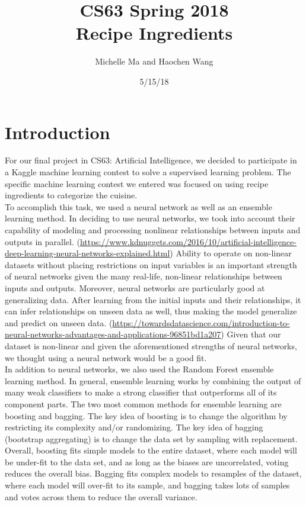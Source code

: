 \documentclass[11pt]{article}
\title{CS63 Spring 2018\\Recipe Ingredients}
\author{Michelle Ma and Haochen Wang}
\date{5/15/18}
\begin{document}
\maketitle

\section{Introduction}

For our final project in CS63: Artificial Intelligence, we decided to participate
in a Kaggle machine learning contest to solve a supervised learning problem. The
specific machine learning contest we entered was focused on using recipe ingredients
to categorize the cuisine. \\

To accomplish this task, we used a neural network as well as
an ensemble learning method. In deciding to use neural networks, we took into
account their capability of modeling and processing nonlinear relationships between
inputs and outputs in parallel.
(\url{https://www.kdnuggets.com/2016/10/artificial-intelligence-deep-learning-neural-networks-explained.html})
Ability to operate on non-linear datasets without placing restrictions on input variables
is an important strength of neural networks
given the many real-life, non-linear relationships between inputs and outputs. Moreover,
neural networks are particularly good at generalizing data. After learning from
the initial inputs and their relationships, it can infer relationships on
unseen data as well, thus making the model generalize and predict on unseen data.
(\url{https://towardsdatascience.com/introduction-to-neural-networks-advantages-and-applications-96851bd1a207})
Given that our dataset is non-linear and given the aforementioned strengths of
neural networks, we thought using a neural network would be a good fit.\\

In addition to neural networks, we also used the Random Forest ensemble
learning method. In general, ensemble learning works by combining the output
of many weak classifiers to make a strong classifier that outperforms all of
its component parts. The two most common methods for ensemble learning are
boosting and bagging. The key idea of boosting is to change the algorithm
by restricting its complexity and/or randomizing. The key idea of bagging (bootstrap
aggregating) is to change the data set by sampling with replacement. Overall,
boosting fits simple models to the entire
dataset, where each model will be under-fit to the data set, and as long as
the biases are uncorrelated, voting reduces the overall bias. Bagging
fits complex models to resamples of the dataset, where each model will
over-fit to its sample, and bagging takes lots of samples and votes across them
to reduce the overall variance.  \\
\end{document}
